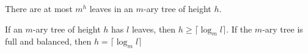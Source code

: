 \begin{theorem}
There are at most $m^h$ leaves in an $m$-ary tree of height $h$.
\end{theorem}

\begin{corollary}
If an $m$-ary tree of height $h$ has $l$ leaves, then $h \ge \lceil \log_ml \rceil$. If the $m$-ary tree is full and balanced, then $h= \lceil \log_ml \rceil$ 
\end{corollary}

\newpage


